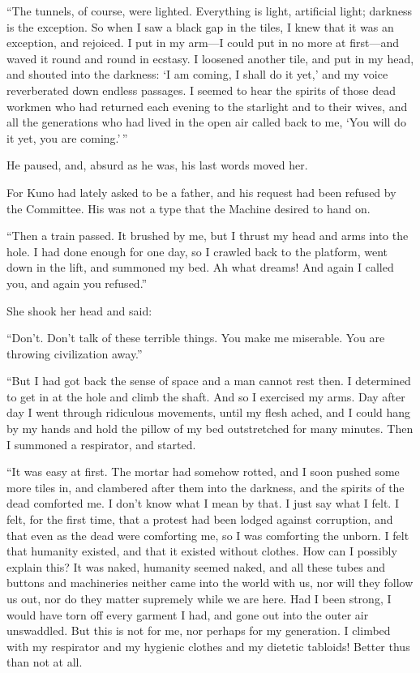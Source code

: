 ``The tunnels, of course, were lighted. Everything is light, artificial light; darkness is the exception. So when I saw a black gap in the tiles, I knew that it was an exception, and rejoiced. I put in my arm---I could put in no more at first---and waved it round and round in ecstasy. I loosened another tile, and put in my head, and shouted into the darkness: `I am coming, I shall do it yet,' and my voice reverberated down endless passages. I seemed to hear the spirits of those dead workmen who had returned each evening to the starlight and to their wives, and all the generations who had lived in the open air called back to me, `You will do it yet, you are coming.'\,''

He paused, and, absurd as he was, his last words moved her.

For Kuno had lately asked to be a father, and his request had been refused by the Committee. His was not a type that the Machine desired to hand on.

``Then a train passed. It brushed by me, but I thrust my head and arms into the hole. I had done enough for one day, so I crawled back to the platform, went down in the lift, and summoned my bed. Ah what dreams! And again I called you, and again you refused.''

She shook her head and said:

``Don't. Don't talk of these terrible things. You make me miserable. You are throwing civilization away.''

``But I had got back the sense of space and a man cannot rest then. I determined to get in at the hole and climb the shaft. And so I exercised my arms. Day after day I went through ridiculous movements, until my flesh ached, and I could hang by my hands and hold the pillow of my bed outstretched for many minutes. Then I summoned a respirator, and started.

``It was easy at first. The mortar had somehow rotted, and I soon pushed some more tiles in, and clambered after them into the darkness, and the spirits of the dead comforted me. I don't know what I mean by that. I just say what I felt. I felt, for the first time, that a protest had been lodged against corruption, and that even as the dead were comforting me, so I was comforting the unborn. I felt that humanity existed, and that it existed without clothes. How can I possibly explain this? It was naked, humanity seemed naked, and all these tubes and buttons and machineries neither came into the world with us, nor will they follow us out, nor do they matter supremely while we are here. Had I been strong, I would have torn off every garment I had, and gone out into the outer air unswaddled. But this is not for me, nor perhaps for my generation. I climbed with my respirator and my hygienic clothes and my dietetic tabloids! Better thus than not at all.

